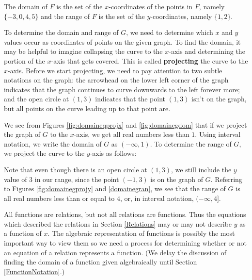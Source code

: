 {
The domain of $F$ is the set of the $x$-coordinates of the points in $F$, namely  $\{ -3, 0, 4, 5 \}$ and the range of $F$ is the set of the $y$-coordinates, namely $\{ 1,2 \}.$

\smallskip

\noindent To determine the domain and range of $G$, we need to determine which $x$ and $y$ values occur as coordinates of points on the given graph.  To find the domain, it may be helpful to imagine collapsing the curve to the $x$-axis and determining the portion of the $x$-axis that gets covered.  This is called  \textbf{projecting} the curve to the $x$-axis.  Before we start projecting, we need to pay attention to two subtle notations on the graph:  the arrowhead on the lower left corner of the graph indicates that the graph continues to curve downwards to the left forever more; and the open circle at $(1,3)$ indicates that the point $(1,3)$ isn't on the graph, but all points on the curve leading up to that point are.



We see from Figures \ref{fig:domaineqprojx} and \ref{fig:domainegdom} that if we project the graph of $G$ to the $x$-axis, we get all real numbers less than $1$.  Using interval notation, we write the domain of $G$ as $(-\infty, 1)$.  To determine the range of $G$, we project the curve to the $y$-axis as follows: 


Note that even though there is an open circle at $(1,3)$, we still include the $y$ value of $3$ in our range, since the point $(-1,3)$ is on the graph of $G$.  Referring to Figures \ref{fig:domainegprojy} and \ref{domainegran}, we see that the range of $G$ is all real numbers less than or equal to $4$, or, in interval notation,  $(-\infty, 4]$. 
}

\medskip

All functions are relations, but not all relations are functions.  Thus the equations which described the relations in Section \ref{Relations} may or may not describe $y$ as a function of $x$.  The algebraic representation of functions is possibly the most important way to view them so we need a process for determining whether or not an equation of a relation represents a function.  (We delay the discussion of finding the domain of a function given algebraically until Section \ref{FunctionNotation}.)



